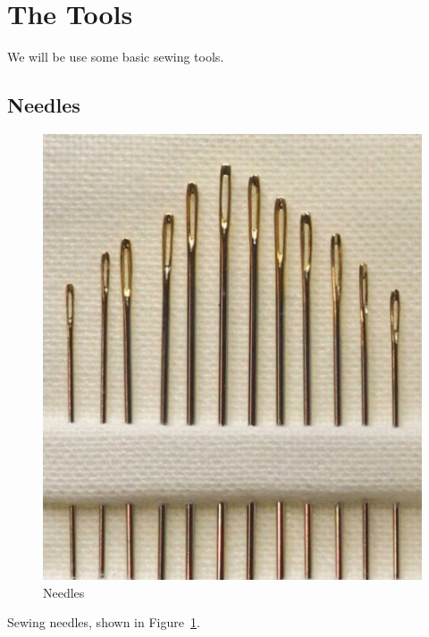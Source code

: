 \documentclass[letterpaper,twoside,12pt]{article}
\begin{document}
\section{The Tools}
We will be use some basic sewing tools.
\subsection{Needles}
\begin{figure}[hbpt]\begin{centering}%
\includegraphics[width=5in]{Needles.jpg}
\caption{Needles}
\label{fig:needles}
\end{centering}\end{figure}
Sewing needles, shown in Figure~\ref{fig:needles}.
\clearpage
\end{document}
